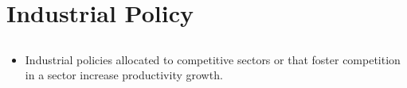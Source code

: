 \documentclass[10pt]{article} %
\begin{document}
\section{Industrial Policy}

    \subsection{\cite{Aghionetal2015}}
    \begin{itemize}
        \item Industrial policies allocated to competitive sectors or that foster competition in a sector increase productivity growth.
    \end{itemize}

    \subsection{\cite{JuhaszLaneRodrik2023}}
\end{document}

